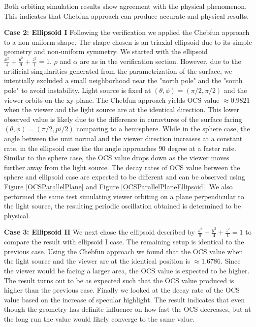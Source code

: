 \documentclass[11pt]{amsart}
\theoremstyle{definition}
\begin{document}
Both orbiting simulation results show agreement with the physical phenomenon. This indicates that Chebfun approach can produce accurate and physical results.

{\bf Case 2: Ellipsoid I} Following the verification we applied the Chebfun approach to a non-uniform shape. The shape chosen is an triaxial ellipsoid due to its simple geometry and non-uniform symmetry. We started with the ellipsoid $\frac{x^2}{4}+\frac{y^2}{9}+\frac{z^2}{1} = 1$. $\rho$ and $\alpha$ are as in the verification section. However, due to the artificial singularities generated from the parametrization of the surface, we intentially excluded a small neighborhood near the "north pole" and the "south pole" to avoid instability. Light source is fixed at $(\theta,\phi) = (\pi/2, \pi/2)$ and the viewer orbits on the xy-plane. The Chebfun approach yields OCS value $\approx 0.9821$ when the viewer and the light source are at the identical direction. This lower observed value is likely due to the difference in curavtures of the surface facing $(\theta, \phi)=(\pi/2, pi/2)$ comparing to a hemisphere. While in the sphere case, the angle between the unit normal and the viewer direction increases at a constant rate, in the ellipsoid case the the angle approaches $90$ degree at a faster rate. Similar to the sphere case, the OCS value drops down as the viewer moves further away from the light source. The decay rates of OCS value between the sphere and ellipsoid case are expected to be different and can be observed using Figure \ref{OCSParallelPlane} and Figure \ref{OCSParallelPlaneEllipsoid}. We also performed the same test simulating viewer orbiting on a plane perpendicular to the light source, the resulting periodic oscillation obtained is determined to be physical.

{\bf Case 3: Ellipsoid II} We next chose the ellipsoid described by $\frac{x^2}{9}+\frac{y^2}{4}+\frac{z^2}{1} = 1$ to compare the result with ellipsoid I case. The remaining setup is identical to the previous case. Using the Chebfun approach we found that the OCS value when the light source and the viewer are at the identical position is $\approx 1.6786$. Since the viewer would be facing a larger area, the OCS value is expected to be higher. The result turns out to be as expected such that the OCS value produced is higher than the previous case. Finally we looked at the decay rate of the OCS value based on the increase of specular highlight. The result indicates that even though the geometry has definite influence on how fast the OCS decreases, but at the long run the value would likely converge to the same value.
\end{document}

